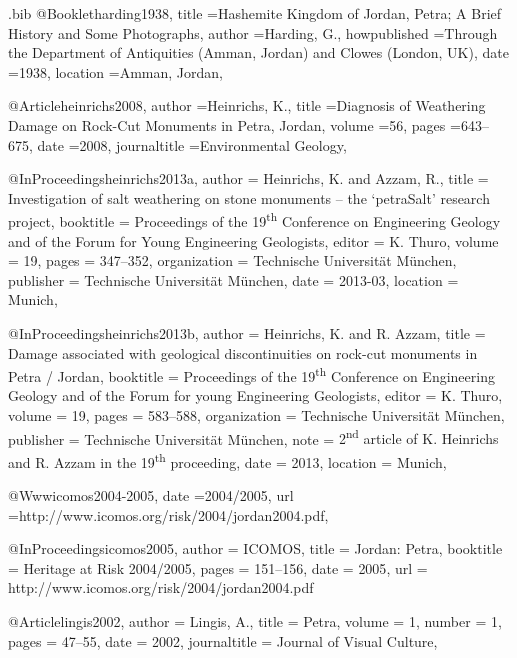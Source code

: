\begin{filecontents}{\IJSRAidentifier.bib}
@Booklet{harding1938,
  title        ={Hashemite Kingdom of Jordan, Petra; A Brief History and Some Photographs},
  author       ={Harding, G.},
  howpublished ={Through the Department of Antiquities (Amman, Jordan) and Clowes (London, UK)},
  date         ={1938},
  location     ={Amman, Jordan},
}

@Article{heinrichs2008,
  author       ={Heinrichs, K.},
  title        ={Diagnosis of Weathering Damage on Rock-Cut Monuments in Petra, Jordan},
  volume       ={56},
  pages        ={643--675},
  date         ={2008},
  journaltitle ={Environmental Geology},
}

@InProceedings{heinrichs2013a,
  author       = {Heinrichs, K. and Azzam, R.},
  title        = {Investigation of salt weathering on stone monuments – the ‘petraSalt’ research project},
  booktitle    = {Proceedings of the 19\textsuperscript{th} Conference on Engineering Geology and of the Forum for Young Engineering Geologists},
  editor       = {K. Thuro},
  volume       = {19},
  pages        = {347--352},
  organization = {Technische Universität München},
  publisher    = {Technische Universität München},
  date         = {2013-03},
  location     = {Munich},
}

@InProceedings{heinrichs2013b,
  author       = {Heinrichs, K. and R. Azzam},
  title        = {Damage associated with geological discontinuities on rock-cut monuments in Petra / Jordan},
  booktitle    = {Proceedings of the 19\textsuperscript{th} Conference on Engineering Geology and of the Forum for young Engineering Geologists},
  editor       = {K. Thuro},
  volume       = {19},
  pages        = {583--588},
  organization = {Technische Universität München},
  publisher    = {Technische Universität München},
  note         = {2\textsuperscript{nd} article of K. Heinrichs and R. Azzam in the 19\textsuperscript{th} proceeding},
  date         = {2013},
  location     = {Munich},
}

@Www{icomos2004-2005,
  date ={2004/2005},
  url  ={http://www.icomos.org/risk/2004/jordan2004.pdf},
}

@InProceedings{icomos2005,
 author = {ICOMOS},
 title = {Jordan: Petra},
 booktitle = {Heritage at Risk 2004/2005},
 pages = {151--156},
 date = {2005},
 url = {http://www.icomos.org/risk/2004/jordan2004.pdf}
}

@Article{lingis2002,
  author       = {Lingis, A.},
  title        = {Petra},
  volume       = {1},
  number       = {1},
  pages        = {47--55},
  date         = {2002},
  journaltitle = {Journal of Visual Culture},
}


\end{filecontents}
